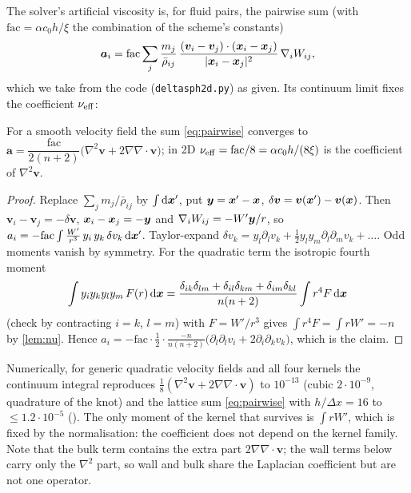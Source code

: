 The solver's artificial viscosity is, for fluid pairs, the pairwise sum (with $\mathrm{fac}=\alpha c_0h/\xi$ the combination of the scheme's constants)
\begin{equation}\label{eq:pairwise}
 \bm a_i=\mathrm{fac}\sum_j\frac{m_j}{\bar\rho_{ij}}\,\frac{(\bm v_i-\bm v_j)\cdot(\bm x_i-\bm x_j)}{|\bm x_i-\bm x_j|^2}\,\nabla_iW_{ij},
\end{equation}
which we take from the code (\texttt{deltasph2d.py}) as given. Its continuum limit fixes the coefficient $\nu_{\rm eff}$:

\begin{proposition}\label{prop:nueff}
For a smooth velocity field the sum \cref{eq:pairwise} converges to $\bm a=\dfrac{\mathrm{fac}}{2(n+2)}\big(\nabla^2\bm v+2\nabla\nabla\!\cdot\bm v\big)$; in 2D $\nu_{\rm eff}=\mathrm{fac}/8=\alpha c_0h/(8\xi)$ is the coefficient of $\nabla^2\bm v$. 
\end{proposition}
\begin{proof}
Replace $\sum_jm_j/\bar\rho_{ij}$ by $\int\mathrm{d}\bm x'$, put $\bm y=\bm x'-\bm x$, $\delta\bm v=\bm v(\bm x')-\bm v(\bm x)$. Then $\bm v_i-\bm v_j=-\delta\bm v$, $\bm x_i-\bm x_j=-\bm y$ and $\nabla_iW_{ij}=-W'\bm y/r$, so
$a_i=-\mathrm{fac}\int\frac{W'}{r^3}\,y_i\,y_k\,\delta v_k\,\mathrm{d}\bm x'$. Taylor-expand $\delta v_k=y_l\partial_lv_k+\frac12y_ly_m\partial_l\partial_mv_k+\dots$.
Odd moments vanish by symmetry. For the quadratic term the isotropic fourth moment
\[
 \int y_iy_ky_ly_m\,F(r)\,\mathrm{d}\bm x=\frac{\delta_{ik}\delta_{lm}+\delta_{il}\delta_{km}+\delta_{im}\delta_{kl}}{n(n+2)}\int r^4F\,\mathrm{d}\bm x
\]
(check by contracting $i=k$, $l=m$) with $F=W'/r^3$ gives $\int r^4F=\int rW'=-n$ by \cref{lem:nu}. Hence
$a_i=-\mathrm{fac}\cdot\frac12\cdot\frac{-n}{n(n+2)}\big(\partial_l\partial_lv_i+2\partial_i\partial_kv_k\big)$, which is the claim.
\end{proof}
Numerically, for generic quadratic velocity fields and all four kernels the continuum integral reproduces $\frac18(\nabla^2\bm v+2\nabla\nabla\!\cdot\bm v)$ to $10^{-13}$ (cubic $2\cdot10^{-9}$, quadrature of the knot) and the lattice sum \cref{eq:pairwise} with $h/\Delta x=16$ to $\le1.2\cdot10^{-5}$ (). The only moment of the kernel that survives is $\int rW'$, which is fixed by the normalisation: the coefficient does not depend on the kernel family.
Note that the bulk term contains the extra part $2\nabla\nabla\!\cdot\bm v$; the wall terms below carry only the $\nabla^2$ part, so wall and bulk share the Laplacian coefficient but are not one operator.


